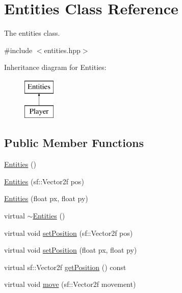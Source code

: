 \hypertarget{classEntities}{\section{Entities Class Reference}
\label{classEntities}
}


The entities class.  




{\ttfamily \#include $<$entities.\-hpp$>$}

Inheritance diagram for Entities\-:\begin{figure}[H]
\begin{center}
\leavevmode
\includegraphics[height=2.000000cm]{classEntities}
\end{center}
\end{figure}
\subsection*{Public Member Functions}
\begin{DoxyCompactItemize}
\item 
\hyperlink{classEntities_a0632e3790f40fec4e831800d48ff491b}{Entities} ()
\item 
\hyperlink{classEntities_af131357f6b31e9e9bec551a5afa57dbd}{Entities} (sf\-::\-Vector2f pos)
\item 
\hyperlink{classEntities_a2b523e8705f7a102b466efad8d3162ba}{Entities} (float px, float py)
\item 
virtual \hyperlink{classEntities_ae9ab15aedaf164a61050f64f1623b94e}{$\sim$\-Entities} ()
\item 
virtual void \hyperlink{classEntities_a10bf20192cbd1316f6b743aa2f4344ec}{set\-Position} (sf\-::\-Vector2f pos)
\item 
virtual void \hyperlink{classEntities_a86f93c9f2b2ece831234f274554de431}{set\-Position} (float px, float py)
\item 
virtual sf\-::\-Vector2f \hyperlink{classEntities_a7cf4315e835d2a68b91151f32fddeff7}{get\-Position} () const 
\item 
virtual void \hyperlink{classEntities_a83e21f073e6792a036b9bd9388b0a083}{move} (sf\-::\-Vector2f movement)
\end{DoxyCompactItemize}


